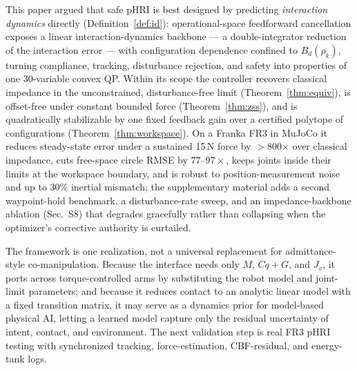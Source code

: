 \documentclass[journal]{IEEEtran}
\begin{document}
This paper argued that safe pHRI is best designed by predicting
\emph{interaction dynamics} directly (Definition~\ref{def:id}):
operational-space feedforward cancellation exposes a linear
interaction-dynamics backbone --- a double-integrator reduction of the
interaction error --- with configuration dependence confined to
$B_d(\rho_k)$, turning compliance, tracking, disturbance rejection, and
safety into properties of one 30-variable convex QP. Within its scope
the controller recovers classical impedance in the unconstrained,
disturbance-free limit (Theorem~\ref{thm:equiv}), is offset-free under
constant bounded force (Theorem~\ref{thm:zss}), and is quadratically
stabilizable by one fixed feedback gain over a certified polytope of
configurations (Theorem~\ref{thm:workspace}). On a Franka FR3 in MuJoCo
it reduces steady-state error under a sustained 15\,N force by
$>$800$\times$ over classical impedance, cuts free-space circle RMSE by
$77$--$97\times$, keeps joints inside their limits at the workspace
boundary, and is robust to position-measurement noise and up to $30\%$
inertial mismatch; the supplementary material adds a second waypoint-hold
benchmark, a disturbance-rate sweep, and an impedance-backbone ablation
(Sec.~S8) that degrades gracefully rather than collapsing when the
optimizer's corrective authority is curtailed.

The framework is one realization, not a universal replacement for
admittance-style co-manipulation. Because the interface needs only
$M$, $C\dot q+G$, and $J_v$,
it ports across torque-controlled arms by substituting the robot model
and joint-limit parameters; and because it reduces contact to an
analytic linear model with a fixed transition matrix, it may serve as a
dynamics prior for model-based physical AI, letting a learned model
capture only the residual uncertainty of intent, contact, and
environment. The next validation step is real FR3 pHRI testing with
synchronized tracking, force-estimation, CBF-residual, and energy-tank
logs.



\end{document}
